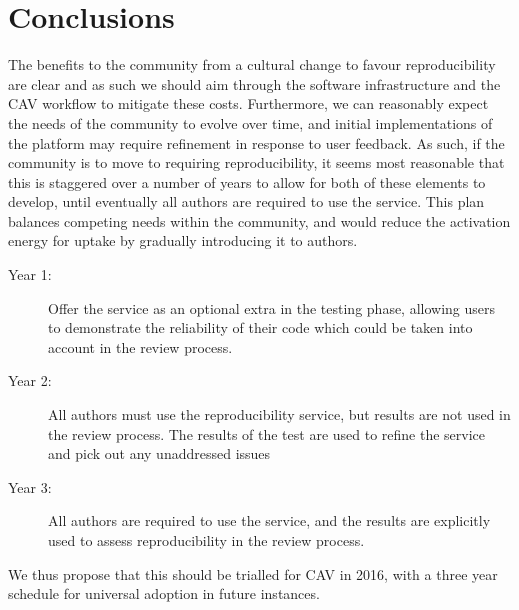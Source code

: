 \documentclass{llncs}
\begin{document}



\section{Conclusions}\label{concl}

The benefits to the community from a cultural change to favour
reproducibility are clear and as such we should aim through the
software infrastructure and the CAV workflow to mitigate these
costs. Furthermore, we can reasonably expect the needs of the
community to evolve over time, and initial implementations of the
platform may require refinement in response to user feedback. As such,
if the community is to move to requiring reproducibility, it seems
most reasonable that this is staggered over a number of years to allow
for both of these elements to develop, until eventually all authors
are required to use the service. This plan balances competing needs
within the community, and would reduce the activation energy for
uptake by gradually introducing it to authors.

\begin{description}
\item[Year 1:] Offer the service as an optional extra in the testing phase, allowing users to demonstrate 
the reliability of their code which could be taken into account in the review process.
\item[Year 2:] All authors must use the reproducibility service, but results are not used in the review
process. The results of the test are used to refine the service and pick out any unaddressed issues
\item[Year 3:] All authors are required to use the service, and the results are explicitly used to 
assess reproducibility in the review process.
\end{description}

We thus propose that this should be trialled for CAV in 2016, with a
three year schedule for universal adoption in future instances.



\end{document}
